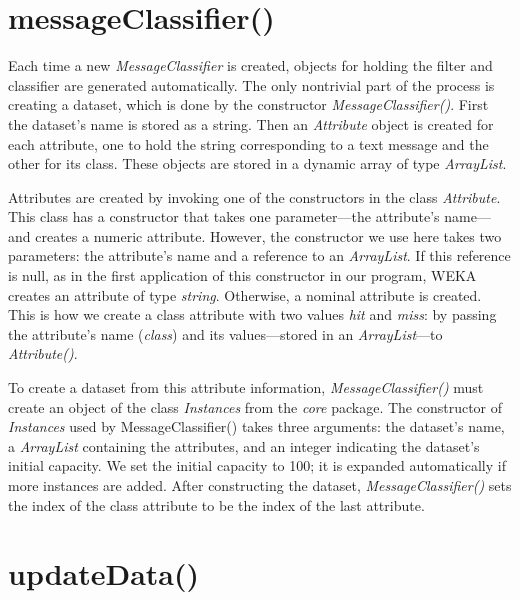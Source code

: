 \section{messageClassifier()}

Each time a new \textit{MessageClassifier} is created, objects for
holding the filter and classifier are generated automatically. The
only nontrivial part of the process is creating a dataset, which is
done by the constructor \textit{MessageClassifier()}. First the
dataset's name is stored as a string. Then an \textit{Attribute}
object is created for each attribute, one to hold the string
corresponding to a text message and the other for its class. These
objects are stored in a dynamic array of type \textit{ArrayList}.

Attributes are created by invoking one of the constructors in the
class \textit{Attribute}. This class has a constructor that takes one
parameter---the attribute's name---and creates a numeric
attribute. However, the constructor we use here takes two parameters:
the attribute's name and a reference to an \textit{ArrayList}. If this
reference is null, as in the first application of this constructor in
our program, WEKA creates an attribute of type
\textit{string}. Otherwise, a nominal attribute is created. This is
how we create a class attribute with two values \textit{hit} and
\textit{miss}: by passing the attribute's name (\textit{class}) and
its values---stored in an \textit{ArrayList}---to
\textit{Attribute()}.

To create a dataset from this attribute information,
\textit{MessageClassifier()} must create an object of the class
\textit{Instances} from the \textit{core} package. The constructor of
\textit{Instances} used by MessageClassifier() takes three arguments:
the dataset's name, a \textit{ArrayList} containing the attributes,
and an integer indicating the dataset's initial capacity. We set the
initial capacity to 100; it is expanded automatically if more
instances are added. After constructing the dataset,
\textit{MessageClassifier()} sets the index of the class attribute to
be the index of the last attribute.

\section{updateData()}

